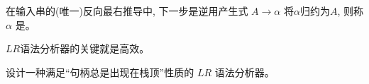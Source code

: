 \begin{frame}{}
  \begin{center}

    \begin{definition}[句柄 (Handle)]
      在输入串的(唯一)反向最右推导中, 下一步是逆用产生式 $A \to \alpha$
      将$\alpha$归约为$A$, 则称 $\alpha$ 是。
    \end{definition}

    \vspace{0.50cm}

    \vspace{0.30cm}
    $LR$语法分析器的关键就是高效。
  \end{center}
\end{frame}





\begin{frame}{}
  \begin{center}

    \pause
    \vspace{0.80cm}
    设计一种满足``句柄总是出现在栈顶''性质的 $LR$ 语法分析器。
  \end{center}
\end{frame}

